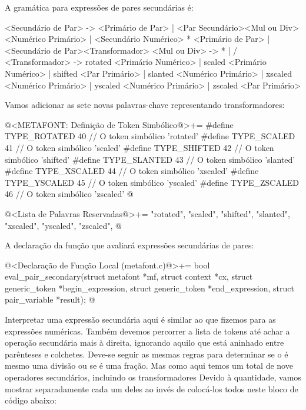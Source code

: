 
A gramática para expressões de pares secundárias é:

\alinhaverbatim
<Secundário de Par> -> <Primário de Par> |
                       <Par Secundário><Mul ou Div><Numérico Primário> |
                       <Secundário Numérico> * <Primário de Par> |
                       <Secundário de Par><Transformador>
<Mul ou Div> -> * | /
<Transformador> -> rotated <Primário Numérico> |
                   scaled <Primário Numérico> |
                   shifted <Par Primário> |
                   slanted <Numérico Primário> |
                   xscaled <Numérico Primário> |
                   yscaled <Numérico Primário> |
                   zscaled <Par Primário>
\alinhanormal

Vamos adicionar as sete novas palavras-chave representando
transformadores:

\iniciocodigo
@<METAFONT: Definição de Token Simbólico@>+=
#define TYPE_ROTATED  40 // O token simbólico 'rotated'
#define TYPE_SCALED   41 // O token simbólico 'scaled'
#define TYPE_SHIFTED  42 // O token simbólico 'shifted'
#define TYPE_SLANTED  43 // O token simbólico 'slanted'
#define TYPE_XSCALED  44 // O token simbólico 'xscaled'
#define TYPE_YSCALED  45 // O token simbólico 'yscaled'
#define TYPE_ZSCALED  46 // O token simbólico 'zscaled'
@
\fimcodigo

\iniciocodigo
@<Lista de Palavras Reservadas@>+=
"rotated", "scaled", "shifted", "slanted", "xscaled", "yscaled",
"zscaled",
@
\fimcodigo

A declaração da função que avaliará expressões secundárias de pares:

\iniciocodigo
@<Declaração de Função Local (metafont.c)@>+=
bool eval_pair_secondary(struct metafont *mf, struct context *cx,
                         struct generic_token *begin_expression,
                         struct generic_token *end_expression,
                         struct pair_variable *result);
@
\fimcodigo


Interpretar uma expressão secundária aqui é similar ao que fizemos
para as expressões numéricas. Também devemos percorrer a lista de
tokens até achar a operação secundária mais à direita, ignorando
aquilo que está aninhado entre parênteses e colchetes. Deve-se seguir
as mesmas regras para determinar se o \monoespaco{/} é mesmo uma
divisão ou se é uma fração. Mas como aqui temos um total de nove
operadores secundários, incluindo os transformadores Devido à
quantidade, vamos mostrar separadamente cada um deles ao invés de
colocá-los todos neste bloco de código abaixo:

